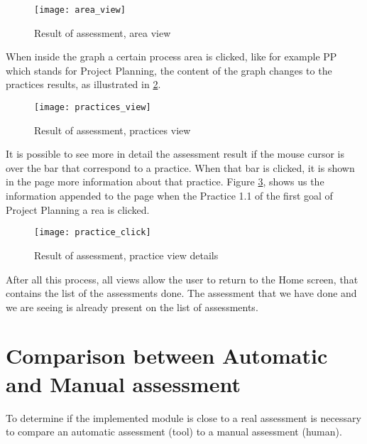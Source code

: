 \begin{figure}[h]
	\begin{center}
		\leavevmode
		\texttt{[image: area\_view]}
		\caption{Result of assessment, area view}
		\label{fig:area_view}
	\end{center}
\end{figure}

When inside the graph a certain process area is clicked, like for example PP which stands for Project Planning, the content of the graph changes to the practices results, as illustrated in \ref{fig:practices_view}.


\begin{figure}[!htb]
	\begin{center}
		\leavevmode
		\texttt{[image: practices\_view]}
		\caption{Result of assessment, practices view}
		\label{fig:practices_view}
	\end{center}
\end{figure}

It is possible to see more in detail the assessment result if the mouse cursor is over the bar that correspond to a practice. When that bar is clicked, it is shown in the page more information about that practice. Figure \ref{fig:practice_click}, shows us the information appended to the page when the Practice 1.1 of the first goal of Project Planning a	rea is clicked.

\begin{figure}[!htb]
	\begin{center}
		\leavevmode
		\texttt{[image: practice\_click]}
		\caption{Result of assessment, practice view details}
		\label{fig:practice_click}
	\end{center}
\end{figure}

After all this process, all views allow the user to return to the Home screen, that contains the list of the assessments done. The assessment that we have done and we are seeing is already present on the list of assessments.
 
\section{Comparison between Automatic and Manual assessment} \label{sec:automatic}

To determine if the implemented module is close to a real assessment is necessary to compare an automatic assessment (tool) to a manual assessment (human).

